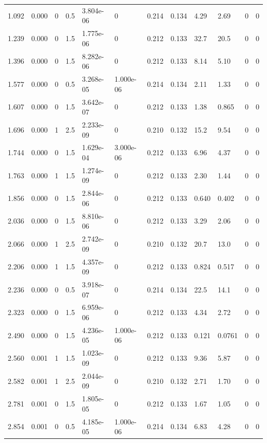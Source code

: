 \documentclass[preview]{standalone}
\begin{document}
{{\begin{tabular}{L{1.2cm}C{1.2cm} C{0.3cm}C{0.5cm} C{1.4cm}C{1.4cm} C{1.4cm}C{1.4cm} C{1.6cm}C{1.6cm} C{1.6cm}C{1.6cm}}
  1.092  &  0.000  & 0     & 0.5 &  3.804e-06  & 0  &  0.214&   0.134& 4.29 & 2.69   &  0 & 0  \\ 
  1.239  &  0.000  & 0     & 1.5 &  1.775e-06  & 0  &  0.212&   0.133& 32.7 & 20.5   &  0 & 0  \\ 
  1.396  &  0.000  & 0     & 1.5 &  8.282e-06  & 0  &  0.212&   0.133& 8.14 & 5.10   &  0 & 0  \\ 
  1.577  &  0.000  & 0     & 0.5 &  3.268e-05  & 1.000e-06  &  0.214&   0.134& 2.11 & 1.33   &  0 & 0  \\ 
  1.607  &  0.000  & 0     & 1.5 &  3.642e-07  & 0  &  0.212&   0.133& 1.38 & 0.865   &  0 & 0  \\ 
  1.696  &  0.000  & 1     & 2.5 &  2.233e-09  & 0  &  0.210&   0.132& 15.2 & 9.54   &  0 & 0  \\ 
  1.744  &  0.000  & 0     & 1.5 &  1.629e-04  & 3.000e-06  &  0.212&   0.133& 6.96 & 4.37   &  0 & 0  \\ 
  1.763  &  0.000  & 1     & 1.5 &  1.274e-09  & 0  &  0.212&   0.133& 2.30 & 1.44   &  0 & 0  \\ 
  1.856  &  0.000  & 0     & 1.5 &  2.844e-06  & 0  &  0.212&   0.133& 0.640 & 0.402   &  0 & 0  \\ 
  2.036  &  0.000  & 0     & 1.5 &  8.810e-06  & 0  &  0.212&   0.133& 3.29 & 2.06   &  0 & 0  \\ 
  2.066  &  0.000  & 1     & 2.5 &  2.742e-09  & 0  &  0.210&   0.132& 20.7 & 13.0   &  0 & 0  \\ 
  2.206  &  0.000  & 1     & 1.5 &  4.357e-09  & 0  &  0.212&   0.133& 0.824 & 0.517   &  0 & 0  \\ 
  2.236  &  0.000  & 0     & 0.5 &  3.918e-07  & 0  &  0.214&   0.134& 22.5 & 14.1   &  0 & 0  \\ 
  2.323  &  0.000  & 0     & 1.5 &  6.959e-06  & 0  &  0.212&   0.133& 4.34 & 2.72   &  0 & 0  \\ 
  2.490  &  0.000  & 0     & 1.5 &  4.236e-05  & 1.000e-06  &  0.212&   0.133& 0.121 & 0.0761   &  0 & 0  \\ 
  2.560  &  0.001  & 1     & 1.5 &  1.023e-09  & 0  &  0.212&   0.133& 9.36 & 5.87   &  0 & 0  \\ 
  2.582  &  0.001  & 1     & 2.5 &  2.044e-09  & 0  &  0.210&   0.132& 2.71 & 1.70   &  0 & 0  \\ 
  2.781  &  0.001  & 0     & 1.5 &  1.805e-05  & 0  &  0.212&   0.133& 1.67 & 1.05   &  0 & 0  \\ 
  2.854  &  0.001  & 0     & 0.5 &  4.185e-05  & 1.000e-06  &  0.214&   0.134& 6.83 & 4.28   &  0 & 0  \\ 

\end{tabular}}}
\end{document}
